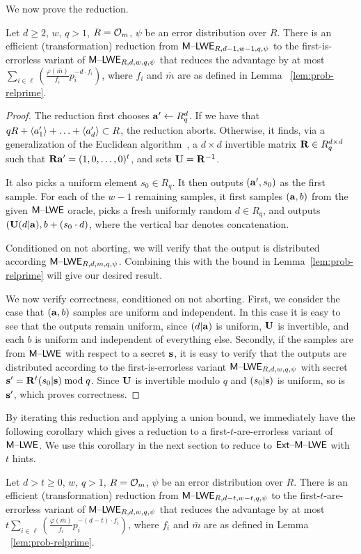 We now prove the reduction.
\begin{lemma}\label{lem:first-errorless}
  Let $d \geq 2$, $w$, $q > 1$, $R=\mathcal{O}_{m}$, $\psi$ be an error distribution
  over $R$. There is an efficient (transformation) reduction
  from $\mathsf{M \text{\textendash} LWE}_{R,d-1,w-1,q,\psi}$ to the first-is-errorless variant of
  $\mathsf{M \text{\textendash} LWE}_{R,d,w,q,\psi}$ that reduces the advantage by at most
$\sum_{i \in
  \ell}\left(\frac{\varphi(\bar{m})}{f_i}p_i^{-d\cdot f_i} \right)$, where
  $f_i$ and $\bar{m}$ are as defined in Lemma ~\ref{lem:prob-relprime}.
\end{lemma}

\begin{proof}
  The reduction first chooses $\mathbf{a}'\gets R_q^d$. 
If we have that $qR+\langle a'_1\rangle+\ldots+\langle a'_d\rangle \subset R$, the reduction
aborts. Otherwise, it finds, via a generalization of the
  Euclidean algorithm~\cite{extendeuclidideals}, a $d \times d$
  invertible matrix  $\mathbf{R} \in R_q^{d \times d}$ such that
  $\mathbf{R}\mathbf{a}'=(1,0,\ldots,0)^t$, and sets $\mathbf{U} = \mathbf{R}^{-1}$.  

It also picks a uniform element $s_0 \in
R_q$. It then outputs $(\mathbf{a}', s_0)$  as the first sample. For
each of the $w-1$ remaining samples, it first samples $(\mathbf{a},b)$ from
the given $\mathsf{M \text{\textendash} LWE}$ oracle, picks a fresh uniformly random $d \in
R_q$, and outputs $(\mathbf{U}(d|\mathbf{a}), b+ (s_0\cdot d)$, where the
vertical bar denotes concatenation. 

Conditioned on not aborting, we will verify that the
output is distributed according $\mathsf{M \text{\textendash} LWE}_{R,d,m,q,\psi}$. Combining this
with the bound in Lemma~\ref{lem:prob-relprime} will give our desired result.

We now verify correctness, conditioned on not aborting. First, we consider the
case that
$(\mathbf{a},b)$ samples are uniform and independent. In this case it is
easy to see that the outputs remain uniform, since $(d|\mathbf{a})$ is
uniform, $\mathbf{U}$ is invertible, and each $b$ is uniform and independent of
everything else. Secondly, if the samples are from $\mathsf{M \text{\textendash} LWE}$ with
respect to a secret $\mathbf{s}$, it is easy to verify that the outputs are
distributed according to the first-is-errorless variant
$\mathsf{M \text{\textendash} LWE}_{R,d,w,q,\psi}$ with secret $\mathbf{s}'=\mathbf{R}^{t}(s_0|\mathbf{s})
\bmod{q}$. Since $\mathbf{U}$ is invertible modulo $q$ and $(s_0|\mathbf{s})$ is
uniform, so is $\mathbf{s}'$, which proves correctness.
\end{proof}

By iterating this reduction and applying a union bound, we immediately have the following
corollary which gives a reduction to a first-$t$-are-errorless variant
of $\mathsf{M \text{\textendash} LWE}$. We use this corollary in the next section to reduce to
$\mathsf{Ext \text{\textendash} M \text{\textendash} LWE}$ with $t$ hints.
\begin{corollary}\label{lem:first-t-errorless}
  Let $d > t \geq 0$, $w$, $q > 1$,  $R=\mathcal{O}_{m}$, $\psi$ be an error
  distribution over $R$. There is an efficient (transformation) reduction from
  $\mathsf{M \text{\textendash} LWE}_{R,d-t,w-t,q,\psi}$ to the first-$t$-are-errorless variant of
  $\mathsf{M \text{\textendash} LWE}_{R,d,w,q,\psi}$ that reduces the advantage by at most
  $t \sum_{i \in
  \ell}\left(\frac{\varphi(\bar{m})}{f_i}p_i^{-(d-t)\cdot f_i} \right)$, where
  $f_i$ and $\bar{m}$ are as defined in Lemma ~\ref{lem:prob-relprime}.
\end{corollary}

